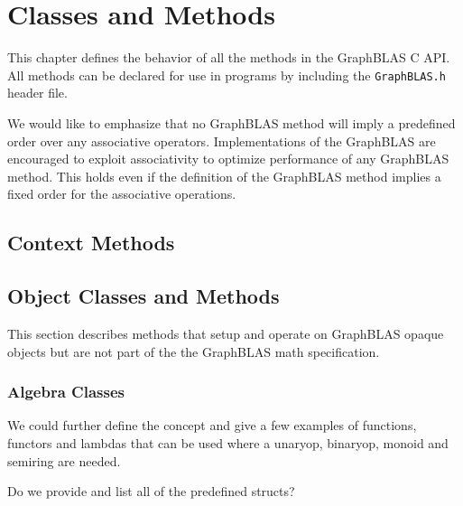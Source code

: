 \chapter{Classes and Methods}
\label{Chp:Methods}

This chapter defines the behavior of all the methods in the GraphBLAS C API.
All methods can be declared for use in programs by including the {\tt GraphBLAS.h} header file.

We would like to emphasize that no GraphBLAS method will imply a predefined order over any associative operators. Implementations of the GraphBLAS are encouraged to exploit associativity to optimize performance of any GraphBLAS method. This holds even if the definition of the GraphBLAS method implies a fixed order for the associative operations.

\section{Context Methods}

\section{Object Classes and Methods}

This section describes methods that setup and operate on GraphBLAS opaque objects
but are not part of the the GraphBLAS math specification.  

\subsection{Algebra Classes}


We could further define the concept and give a few examples of functions, functors and lambdas  that can be used where a unaryop, binaryop, monoid and semiring are needed.

Do we provide and list all of the predefined structs?

